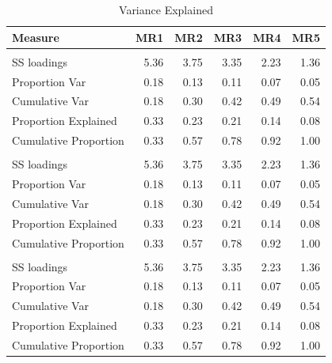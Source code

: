 \documentclass{article}\usepackage[]{graphicx}\usepackage[]{color}
\newenvironment{knitrout}{}{} %
\begin{document}
\begin{knitrout}
\begin{table}
\caption{\label{tab:unnamed-chunk-13}Variance Explained}
\centering
\begin{tabular}[t]{lrrrrr}
\toprule
Measure & MR1 & MR2 & MR3 & MR4 & MR5\\
\midrule
\addlinespace[0.3em]
\multicolumn{6}{l}{\textbf{Unrotated}}\\
\hspace{1em}SS loadings & 5.36 & 3.75 & 3.35 & 2.23 & \vphantom{2} 1.36\\
\hspace{1em}Proportion Var & 0.18 & 0.13 & 0.11 & 0.07 & \vphantom{2} 0.05\\
\hspace{1em}Cumulative Var & 0.18 & 0.30 & 0.42 & 0.49 & \vphantom{2} 0.54\\
\hspace{1em}Proportion Explained & 0.33 & 0.23 & 0.21 & 0.14 & \vphantom{2} 0.08\\
\hspace{1em}Cumulative Proportion & 0.33 & 0.57 & 0.78 & 0.92 & \vphantom{2} 1.00\\
\addlinespace[0.3em]
\multicolumn{6}{l}{\textbf{Varimax}}\\
\hspace{1em}SS loadings & 5.36 & 3.75 & 3.35 & 2.23 & \vphantom{1} 1.36\\
\hspace{1em}Proportion Var & 0.18 & 0.13 & 0.11 & 0.07 & \vphantom{1} 0.05\\
\hspace{1em}Cumulative Var & 0.18 & 0.30 & 0.42 & 0.49 & \vphantom{1} 0.54\\
\hspace{1em}Proportion Explained & 0.33 & 0.23 & 0.21 & 0.14 & \vphantom{1} 0.08\\
\hspace{1em}Cumulative Proportion & 0.33 & 0.57 & 0.78 & 0.92 & \vphantom{1} 1.00\\
\addlinespace[0.3em]
\multicolumn{6}{l}{\textbf{Oblimin}}\\
\hspace{1em}SS loadings & 5.36 & 3.75 & 3.35 & 2.23 & 1.36\\
\hspace{1em}Proportion Var & 0.18 & 0.13 & 0.11 & 0.07 & 0.05\\
\hspace{1em}Cumulative Var & 0.18 & 0.30 & 0.42 & 0.49 & 0.54\\
\hspace{1em}Proportion Explained & 0.33 & 0.23 & 0.21 & 0.14 & 0.08\\
\hspace{1em}Cumulative Proportion & 0.33 & 0.57 & 0.78 & 0.92 & 1.00\\
\bottomrule
\end{tabular}
\end{table}


\end{knitrout}
\end{document}
